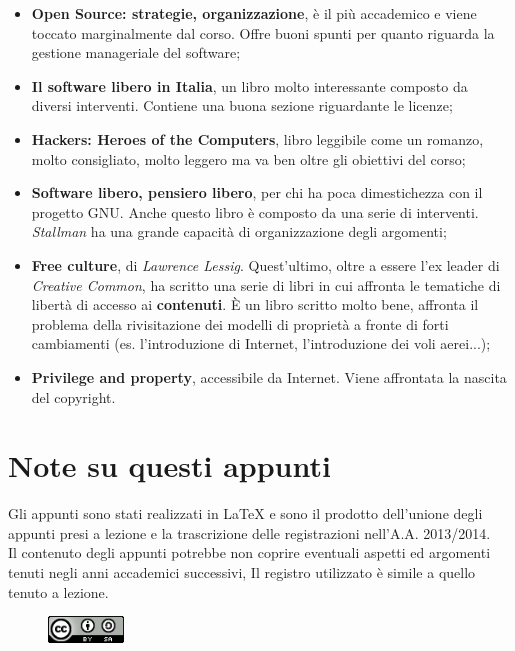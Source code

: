 \begin{itemize}

\item \textbf{Open Source: strategie, organizzazione}, è il più accademico e viene toccato marginalmente dal corso. Offre buoni spunti per quanto riguarda la gestione manageriale del software;
\item \textbf{Il software libero in Italia}, un libro molto interessante composto da diversi interventi. Contiene una buona sezione riguardante le licenze;
\item \textbf{Hackers: Heroes of the Computers}, libro leggibile come un romanzo, molto consigliato, molto leggero ma va ben oltre gli obiettivi del corso;
\item \textbf{Software libero, pensiero libero}, per chi ha poca dimestichezza con il progetto GNU. Anche questo libro è composto da una serie di interventi. \textit{Stallman} ha una grande capacità di organizzazione degli argomenti;
\item \textbf{Free culture}, di \textit{Lawrence Lessig}. Quest'ultimo, oltre a essere l'ex leader di \textit{Creative Common}, ha scritto una serie di libri in cui affronta le tematiche di libertà di accesso ai \textbf{contenuti}. È un libro scritto molto bene, affronta il problema della rivisitazione dei modelli di proprietà a fronte di forti cambiamenti (es. l'introduzione di Internet, l'introduzione dei voli aerei...);
\item \textbf{Privilege and property}, accessibile da Internet. Viene affrontata la nascita del copyright.

\end{itemize}

\section{Note su questi appunti}
Gli appunti sono stati realizzati in \LaTeX\xspace e sono il prodotto dell'unione degli appunti presi a lezione e la trascrizione delle registrazioni nell'A.A. 2013/2014. \\

Il contenuto degli appunti potrebbe non coprire eventuali aspetti ed argomenti tenuti negli anni accademici successivi, Il registro utilizzato è simile a quello tenuto a lezione.\\

\begin{figure}
    \includegraphics[width=20mm]{images/cc_by_sa}
\end{figure}


